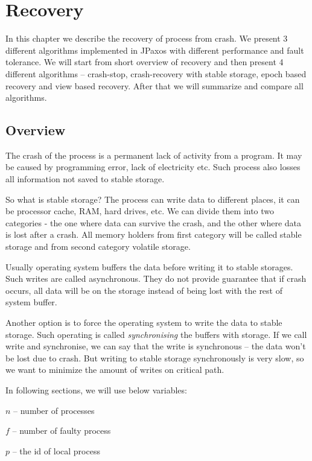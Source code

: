 \chapter{Recovery}

In this chapter we describe the recovery of process from crash. We present 3 different algorithms implemented in JPaxos with different performance and fault tolerance. We will start from short overview of recovery and then present 4 different algorithms -- crash-stop, crash-recovery with stable storage, epoch based recovery and view based recovery. After that we will summarize and compare all algorithms.

\section{Overview}

The crash of the process is a permanent lack of activity from a program. It may be caused by programming error, lack of electricity etc. Such process also losses all information not saved to stable storage.

So what is stable storage? The process can write data to different places, it can be processor cache, RAM, hard drives, etc. We can divide them into two categories - the one where data can survive the crash, and the other where data is lost after a crash. All memory holders from first category will be called stable storage and from second category volatile storage.

Usually operating system buffers the data before writing it to stable storages. Such writes are called asynchronous. They do not provide guarantee that if crash occurs, all data will be on the storage instead of being lost with the rest of system buffer.

Another option is to force the operating system to write the data to stable storage. Such operating is called \emph{synchronising} the buffers with storage. If we call write and synchronise, we can say that the write is synchronous -- the data won't be lost due to crash. But writing to stable storage synchronously is very slow, so we want to minimize the amount of writes on critical path.

In following sections, we will use below variables: 
\begin{tightList}
  \item[$n$] -- number of processes
  \item[$f$] -- number of faulty process
  \item[$p$] -- the id of local process
\end{tightList}

